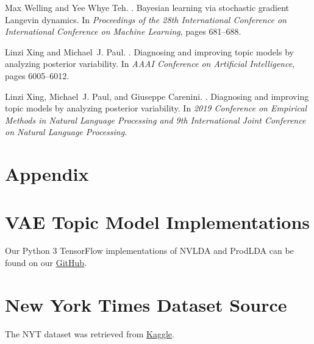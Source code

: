 \documentclass[10pt]{article}
\begin{document}
\begin{thebibliography}{}
Max Welling and Yee Whye Teh.
.
\newblock Bayesian learning via stochastic gradient Langevin dynamics.
\newblock In {\em Proceedings of the 28th International Conference on International Conference on Machine Learning}, pages 681–688.

Linzi Xing and Michael~J. Paul.
.
\newblock Diagnosing and improving topic models by analyzing posterior variability.
\newblock In {\em AAAI Conference on Artificial Intelligence}, pages 6005–6012.

Linzi Xing, Michael~J. Paul, and Giuseppe Carenini.
.
\newblock Diagnosing and improving topic models by analyzing posterior variability.
\newblock In {\em 2019 Conference on Empirical Methods in Natural Language Processing and 9th International Joint Conference on Natural Language Processing}.

\end{thebibliography}

\appendix

\section*{Appendix}

\section{VAE Topic Model Implementations}\label{sec:code}

Our Python 3 TensorFlow implementations of NVLDA and ProdLDA can be found on our \href{https://github.com/chiukenny/CPSC503-finalproject}{GitHub}.

\section{New York Times Dataset Source}\label{sec:datasource}

The NYT dataset was retrieved from \href{https://www.kaggle.com/nzalake52/new-york-times-articles}{Kaggle}.
\end{document}

